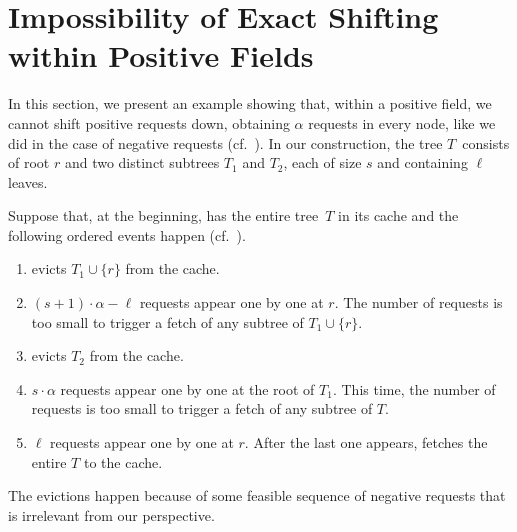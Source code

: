 
\section{Impossibility of Exact Shifting within Positive Fields}
\label{sec:shifting_lower_bound}

In this section, we present an example  showing that, within a positive field,
we cannot shift positive requests down, obtaining $\alpha$ requests in every
node, like we did in the case of negative requests
(cf.~). In our construction, the tree 
$T$~consists of root $r$ and
two distinct subtrees $T_1$ and $T_2$, each of size $s$ and containing $\ell$
leaves.

\balance

Suppose that, at the beginning, \ALG has the entire tree~$T$ in its cache and
the following ordered events happen (cf.~).
\begin{enumerate}
\item \ALG evicts $T_1 \cup \{ r \}$ from the cache.
\item $(s+1) \cdot \alpha - \ell$ requests appear one by one at $r$. The number of
  requests is too small to trigger a fetch of any subtree of $T_1 \cup \{ r \}$.
\item \ALG evicts $T_2$ from the cache.
\item $s \cdot \alpha$ requests appear one by one at the root of $T_1$. This
  time, the number of requests is too small to trigger a fetch of any
  subtree of $T$.
\item $\ell$ requests appear one by one at $r$. After the last one appears,
  {\ALG} fetches the entire $T$ to the cache.
\end{enumerate}
The evictions happen because of some feasible sequence of negative requests that
is irrelevant from our perspective.

